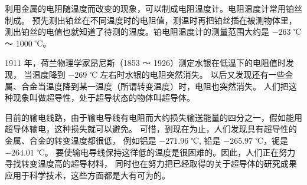利用金属的电阻随温度而改变的现象，可以制成电阻温度计。电阻温度计常用铂丝制成。
预先测出铂丝在不同温度时的电阻值，测温时再把铂丝插在被测物体里，
测出铂丝的电值也就知道了待测的温度。铂电阻温度计的测量范围大约是 $-263$ ℃ ～ 1000 ℃。

1911 年，荷兰物理学家昂尼斯（1853 ～ 1926）测定水银在低温下的电阻值时发现，
当温度降到 $-269$ ℃ 左右时水银的电阻突然消失。
以后又发现还有一些金属、合金当温度降到某一温度（所谓转变温度）时，电阻也突然消失。
人们把这种现象叫做超导性，处于超导状态的物体叫超导体。

目前的输电线路，由于输电导线有电阻而大约损失输送能量的四分之一，假如能用超导体输电，这种损失就可以避免。
可惜，到现在为止，人们发现具有超导性的金属、合金的转变温度都很低，
例如铝是 $-271.96$ ℃, 铅是 $-265.97$ ℃，铌是 $-264.01$ ℃。
要使输电导线保持这徉低的温度是很困难的。因此，人们正在努力寻找转变温度高的超导材料，
同时也在努力把已经取得的关于超导体的研究成果应用于科学技术，这些方面都是大有可为的。

